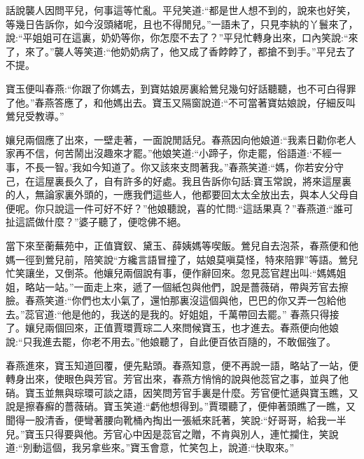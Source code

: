 
\begin{parag}
    話說襲人因問平兒，何事這等忙亂。平兒笑道:“都是世人想不到的，說來也好笑，等幾日告訴你，如今沒頭緒呢，且也不得閒兒。”一語未了，只見李紈的丫鬟來了，說:“平姐姐可在這裏，奶奶等你，你怎麼不去了？”平兒忙轉身出來，口內笑說:“來了，來了。”襲人等笑道:“他奶奶病了，他又成了香餑餑了，都搶不到手。”平兒去了不提。
\end{parag}


\begin{parag}
    寶玉便叫春燕:“你跟了你媽去，到寶姑娘房裏給鶯兒幾句好話聽聽，也不可白得罪了他。”春燕答應了，和他媽出去。寶玉又隔窗說道:“不可當著寶姑娘說，仔細反叫鶯兒受教導。”
\end{parag}


\begin{parag}
    孃兒兩個應了出來，一壁走著，一面說閒話兒。春燕因向他娘道:“我素日勸你老人家再不信，何苦鬧出沒趣來才罷。”他娘笑道:“小蹄子，你走罷，俗語道:‘不經一事，不長一智。’我如今知道了。你又該來支問著我。”春燕笑道:“媽，你若安分守己，在這屋裏長久了，自有許多的好處。我且告訴你句話:寶玉常說，將來這屋裏的人，無論家裏外頭的，一應我們這些人，他都要回太太全放出去，與本人父母自便呢。你只說這一件可好不好？”他娘聽說，喜的忙問:“這話果真？”春燕道:“誰可扯這謊做什麼？”婆子聽了，便唸佛不絕。
\end{parag}


\begin{parag}
    當下來至蘅蕪苑中，正值寶釵、黛玉、薛姨媽等喫飯。鶯兒自去泡茶，春燕便和他媽一徑到鶯兒前，陪笑說“方纔言語冒撞了，姑娘莫嗔莫怪，特來陪罪”等語。鶯兒忙笑讓坐，又倒茶。他孃兒兩個說有事，便作辭回來。忽見蕊官趕出叫:“媽媽姐姐，略站一站。”一面走上來，遞了一個紙包與他們，說是薔薇硝，帶與芳官去擦臉。春燕笑道:“你們也太小氣了，還怕那裏沒這個與他，巴巴的你又弄一包給他去。”蕊官道:“他是他的，我送的是我的。好姐姐，千萬帶回去罷。” 春燕只得接了。孃兒兩個回來，正值賈環賈琮二人來問候寶玉，也才進去。春燕便向他娘說:“只我進去罷，你老不用去。”他娘聽了，自此便百依百隨的，不敢倔強了。
\end{parag}


\begin{parag}
    春燕進來，寶玉知道回覆，便先點頭。春燕知意，便不再說一語，略站了一站，便轉身出來，使眼色與芳官。芳官出來，春燕方悄悄的說與他蕊官之事，並與了他硝。寶玉並無與琮環可談之語，因笑問芳官手裏是什麼。芳官便忙遞與寶玉瞧，又說是擦春癬的薔薇硝。寶玉笑道:“虧他想得到。”賈環聽了，便伸著頭瞧了一瞧，又聞得一股清香，便彎著腰向靴桶內掏出一張紙來託著，笑說:“好哥哥，給我一半兒。”寶玉只得要與他。芳官心中因是蕊官之贈，不肯與別人，連忙攔住，笑說道:“別動這個，我另拿些來。”寶玉會意，忙笑包上，說道:“快取來。”
\end{parag}


